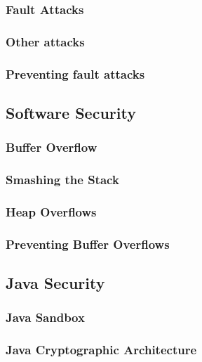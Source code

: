 \documentclass[a4paper, 10 pt, conference]{ieeeconf}
\begin{document}
\subsubsection{\textbf{Fault Attacks}}
\vspace{0.5cm}
\subsubsection{\textbf{Other attacks}}
\vspace{0.5cm}
\subsubsection{\textbf{Preventing fault attacks}}


\subsection{\textbf{Software Security}}
\vspace{0.5cm}
\subsubsection{\textbf{Buffer Overflow}}
\vspace{0.5cm}
\subsubsection{\textbf{Smashing the Stack}}
\vspace{0.5cm}
\subsubsection{\textbf{Heap Overflows}}
\vspace{0.5cm}
\subsubsection{\textbf{Preventing Buffer Overflows}}


\subsection{\textbf{Java Security}}
\vspace{0.5cm}
\subsubsection{\textbf{Java Sandbox}}
\vspace{0.5cm}
\subsubsection{\textbf{Java Cryptographic Architecture}}
\end{document}
